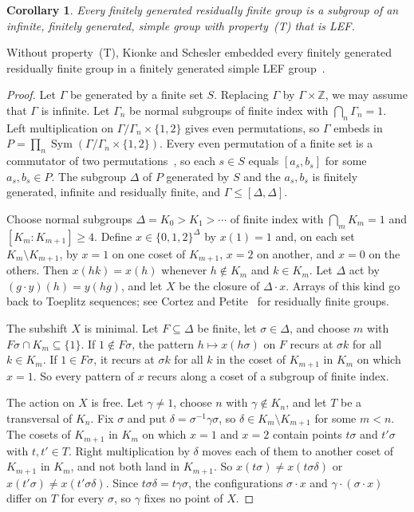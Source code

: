 \documentclass[11pt]{amsart}
\newtheorem{corollary}[theorem]{Corollary}
\newcommand{\Z}{\mathbb Z}
\begin{document}
\begin{corollary}\label{cor:rf}
Every finitely generated residually finite group is a subgroup of an
infinite, finitely generated, simple group with property~\textup{(T)}
that is LEF.
\end{corollary}

Without property~\textup{(T)}, Kionke and Schesler embedded every
finitely generated residually finite group in a finitely generated
simple LEF group~\cite[Theorem~1.2]{KionkeSchesler}.

\begin{proof}
Let $\Gamma$ be generated by a finite set $S$. Replacing $\Gamma$ by
$\Gamma\times\Z$, we may assume that $\Gamma$ is infinite. Let
$\Gamma_n$ be normal subgroups of finite index with
$\bigcap_n\Gamma_n=1$. Left multiplication on
$\Gamma/\Gamma_n\times\{1,2\}$ gives even permutations, so $\Gamma$
embeds in $P=\prod_n\operatorname{Sym}(\Gamma/\Gamma_n\times\{1,2\})$.
Every even permutation of a finite set is a commutator of two
permutations~\cite[Theorem~1]{Ore}, so each $s\in S$ equals $[a_s,b_s]$
for some $a_s,b_s\in P$. The subgroup $\Delta$ of $P$ generated by $S$
and the $a_s,b_s$ is finitely generated, infinite and residually finite,
and $\Gamma\le[\Delta,\Delta]$.

Choose normal subgroups $\Delta=K_0>K_1>\cdots$ of finite index with
$\bigcap_mK_m=1$ and $[K_m:K_{m+1}]\ge4$. Define $x\in\{0,1,2\}^\Delta$
by $x(1)=1$ and, on each set $K_m\setminus K_{m+1}$, by $x=1$ on one
coset of $K_{m+1}$, $x=2$ on another, and $x=0$ on the others. Then
$x(hk)=x(h)$ whenever $h\notin K_m$ and $k\in K_m$. Let $\Delta$ act by
$(g\cdot y)(h)=y(hg)$, and let $X$ be the closure of $\Delta\cdot x$.
Arrays of this kind go back to Toeplitz sequences; see Cortez and
Petite~\cite{CortezPetite} for residually finite groups.

The subshift $X$ is minimal. Let $F\subseteq\Delta$ be finite, let
$\sigma\in\Delta$, and choose $m$ with $F\sigma\cap K_m\subseteq\{1\}$.
If $1\notin F\sigma$, the pattern $h\mapsto x(h\sigma)$ on $F$ recurs at
$\sigma k$ for all $k\in K_m$. If $1\in F\sigma$, it recurs at $\sigma k$
for all $k$ in the coset of $K_{m+1}$ in $K_m$ on which $x=1$. So every
pattern of $x$ recurs along a coset of a subgroup of finite index.

The action on $X$ is free. Let $\gamma\ne1$, choose $n$ with
$\gamma\notin K_n$, and let $T$ be a transversal of $K_n$. Fix $\sigma$
and put $\delta=\sigma^{-1}\gamma\sigma$, so $\delta\in K_m\setminus K_{m+1}$
for some $m<n$. The cosets of $K_{m+1}$ in $K_m$ on which $x=1$ and $x=2$
contain points $t\sigma$ and $t'\sigma$ with $t,t'\in T$. Right
multiplication by $\delta$ moves each of them to another coset of
$K_{m+1}$ in $K_m$, and not both land in $K_{m+1}$. So
$x(t\sigma)\ne x(t\sigma\delta)$ or $x(t'\sigma)\ne x(t'\sigma\delta)$.
Since $t\sigma\delta=t\gamma\sigma$, the configurations $\sigma\cdot x$ and
$\gamma\cdot(\sigma\cdot x)$ differ on $T$ for every $\sigma$, so $\gamma$
fixes no point of $X$.


\end{proof}
\end{document}
